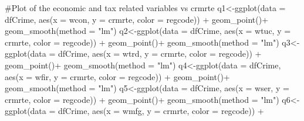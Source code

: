 \documentclass[]{article}
\newenvironment{Shaded}{}{}
\newcommand{\CommentTok}[1]{\textcolor[rgb]{0.00,0.50,0.00}{#1}}
\newcommand{\DataTypeTok}[1]{#1}
\newcommand{\KeywordTok}[1]{\textcolor[rgb]{0.00,0.00,1.00}{#1}}
\newcommand{\NormalTok}[1]{#1}
\newcommand{\OperatorTok}[1]{#1}
\newcommand{\StringTok}[1]{\textcolor[rgb]{0.00,0.50,0.50}{#1}}
\begin{document}
\begin{Shaded}
\begin{Highlighting}[]
\CommentTok{#Plot of the economic and tax related variables vs crmrte}
\NormalTok{q1<-}\KeywordTok{ggplot}\NormalTok{(}\DataTypeTok{data =}\NormalTok{ dfCrime, }\KeywordTok{aes}\NormalTok{(}\DataTypeTok{x =}\NormalTok{ wcon, }\DataTypeTok{y =}\NormalTok{ crmrte, }\DataTypeTok{color =}\NormalTok{ regcode)) }\OperatorTok{+}\StringTok{ }
\StringTok{      }\KeywordTok{geom_point}\NormalTok{()}\OperatorTok{+}
\StringTok{  }\KeywordTok{geom_smooth}\NormalTok{(}\DataTypeTok{method =} \StringTok{"lm"}\NormalTok{)}
\NormalTok{q2<-}\KeywordTok{ggplot}\NormalTok{(}\DataTypeTok{data =}\NormalTok{ dfCrime, }\KeywordTok{aes}\NormalTok{(}\DataTypeTok{x =}\NormalTok{ wtuc, }\DataTypeTok{y =}\NormalTok{ crmrte, }\DataTypeTok{color =}\NormalTok{ regcode)) }\OperatorTok{+}\StringTok{ }
\StringTok{      }\KeywordTok{geom_point}\NormalTok{()}\OperatorTok{+}
\StringTok{  }\KeywordTok{geom_smooth}\NormalTok{(}\DataTypeTok{method =} \StringTok{"lm"}\NormalTok{)}
\NormalTok{q3<-}\KeywordTok{ggplot}\NormalTok{(}\DataTypeTok{data =}\NormalTok{ dfCrime, }\KeywordTok{aes}\NormalTok{(}\DataTypeTok{x =}\NormalTok{ wtrd, }\DataTypeTok{y =}\NormalTok{ crmrte, }\DataTypeTok{color =}\NormalTok{ regcode)) }\OperatorTok{+}\StringTok{ }
\StringTok{      }\KeywordTok{geom_point}\NormalTok{()}\OperatorTok{+}
\StringTok{  }\KeywordTok{geom_smooth}\NormalTok{(}\DataTypeTok{method =} \StringTok{"lm"}\NormalTok{)}
\NormalTok{q4<-}\KeywordTok{ggplot}\NormalTok{(}\DataTypeTok{data =}\NormalTok{ dfCrime, }\KeywordTok{aes}\NormalTok{(}\DataTypeTok{x =}\NormalTok{ wfir, }\DataTypeTok{y =}\NormalTok{ crmrte, }\DataTypeTok{color =}\NormalTok{ regcode)) }\OperatorTok{+}\StringTok{ }
\StringTok{      }\KeywordTok{geom_point}\NormalTok{()}\OperatorTok{+}
\StringTok{  }\KeywordTok{geom_smooth}\NormalTok{(}\DataTypeTok{method =} \StringTok{"lm"}\NormalTok{)}
\NormalTok{q5<-}\KeywordTok{ggplot}\NormalTok{(}\DataTypeTok{data =}\NormalTok{ dfCrime, }\KeywordTok{aes}\NormalTok{(}\DataTypeTok{x =}\NormalTok{ wser, }\DataTypeTok{y =}\NormalTok{ crmrte, }\DataTypeTok{color =}\NormalTok{ regcode)) }\OperatorTok{+}\StringTok{ }
\StringTok{      }\KeywordTok{geom_point}\NormalTok{()}\OperatorTok{+}
\StringTok{  }\KeywordTok{geom_smooth}\NormalTok{(}\DataTypeTok{method =} \StringTok{"lm"}\NormalTok{)}
\NormalTok{q6<-}\KeywordTok{ggplot}\NormalTok{(}\DataTypeTok{data =}\NormalTok{ dfCrime, }\KeywordTok{aes}\NormalTok{(}\DataTypeTok{x =}\NormalTok{ wmfg, }\DataTypeTok{y =}\NormalTok{ crmrte, }\DataTypeTok{color =}\NormalTok{ regcode)) }\OperatorTok{+}\StringTok{ }

\end{Highlighting}
\end{Shaded}
\end{document}
